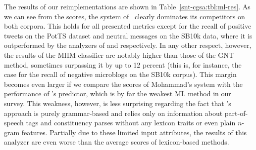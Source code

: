 The results of our reimplementations are shown in
Table~\ref{snt-cgsa:tbl:ml-res}.  As we can see from the scores, the
system of~\citet{Mohammad:13} clearly dominates its competitors on
both corpora. This holds for all presented metrics except for the
recall of positive tweets on the PotTS dataset and neutral messages on
the SB10k data, where it is outperformed by the analyzers of
\citet{Guenther:14} and \citet{Gamon:04} respectively.  In any other
respect, however, the results of the MHM classifier are notably higher
than those of the GNT method, sometimes surpassing it by up to 12
percent (this is, for instance, the case for the recall of negative
microblogs on the SB10k corpus).  This margin becomes even larger if
we compare the scores of Mohammad's system with the performance of
\citeauthor{Gamon:04}'s predictor, which is by far the weakest ML
method in our survey.  This weakness, however, is less surprising
regarding the fact that \citeauthor{Gamon:04}'s approach is purely
grammar-based and relies only on information about part-of-speech tags
and constituency parses without any lexicon traits or even plain
$n$-gram features.  Partially due to these limited input attributes,
the results of this analyzer are even worse than the average scores of
lexicon-based methods.




